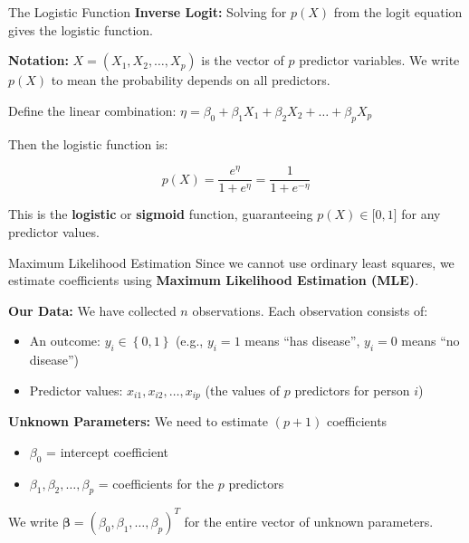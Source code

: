 \documentclass[aspectratio=169,ignorenonframetext]{beamer}
\begin{document}
\begin{frame}{The Logistic Function}
\textbf{Inverse Logit:} Solving for \(p(X)\) from the logit equation
gives the logistic function.

\textbf{Notation:} \(X = \left( X_{1},X_{2},\ldots,X_{p} \right)\) is
the vector of \(p\) predictor variables. We write \(p(X)\) to mean the
probability depends on all predictors.

Define the linear combination:
\(\eta = \beta_{0} + \beta_{1}X_{1} + \beta_{2}X_{2} + \ldots + \beta_{p}X_{p}\)

Then the logistic function is:

\[p(X) = \frac{e^{\eta}}{1 + e^{\eta}} = \frac{1}{1 + e^{- \eta}}\]

This is the \textbf{logistic} or \textbf{sigmoid} function, guaranteeing
\(p(X) \in \lbrack 0,1\rbrack\) for any predictor values.
\end{frame}

\begin{frame}{Maximum Likelihood Estimation}
Since we cannot use ordinary least squares, we estimate coefficients
using \textbf{Maximum Likelihood Estimation (MLE)}.

\textbf{Our Data:} We have collected \(n\) observations. Each
observation consists of:

\begin{itemize}
\item
  An outcome: \(y_{i} \in \left\{ 0,1 \right\}\) (e.g., \(y_{i} = 1\)
  means ``has disease'', \(y_{i} = 0\) means ``no disease'')
\item
  Predictor values: \(x_{i1},x_{i2},\ldots,x_{ip}\) (the values of \(p\)
  predictors for person \(i\))
\end{itemize}

\textbf{Unknown Parameters:} We need to estimate \((p + 1)\)
coefficients

\begin{itemize}
\item
  \(\beta_{0}\) = intercept coefficient
\item
  \(\beta_{1},\beta_{2},\ldots,\beta_{p}\) = coefficients for the \(p\)
  predictors
\end{itemize}

We write
\(\mathbf{\beta} = \left( \beta_{0},\beta_{1},\ldots,\beta_{p} \right)^{T}\)
for the entire vector of unknown parameters.
\end{frame}
\end{document}

